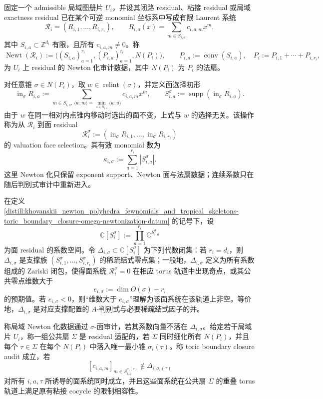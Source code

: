 \begin{definition}\label{distill:khovanskii_newton_polyhedra_fewnomials_and_tropical_skeletons-toric_boundary_closure-omega-newtonization-datum}
固定一个 admissible 局域图册片 \(U_i\)，并设其闭路 residual、粘接 residual 或局域 exactness residual 已在某个可逆 monomial 坐标系中写成有限 Laurent 系统
\[
\mathcal R_i=(R_{i,1},\ldots,R_{i,r_i}),\qquad
R_{i,a}(x)=\sum_{m\in S_{i,a}} c_{i,a,m}x^m,
\]
其中 \(S_{i,a}\subset\mathbb Z^{d_i}\) 有限，且所有 \(c_{i,a,m}\neq 0\)。称
\[
\operatorname{Newt}(\mathcal R_i)
 :=\bigl((S_{i,a})_{a=1}^{r_i},(P_{i,a})_{a=1}^{r_i},N(P_i)\bigr),\qquad
P_{i,a}:=\operatorname{conv}(S_{i,a}),\quad P_i:=P_{i,1}+\cdots+P_{i,r_i},
\]
为 \(U_i\) 上 residual 的 Newton 化审计数据，其中 \(N(P_i)\) 为 \(P_i\) 的法扇。

对任意锥 \(\sigma\in N(P_i)\)，取 \(w\in\operatorname{relint}(\sigma)\)，并定义面选择初形
\[
\operatorname{in}_{\sigma}R_{i,a}:=\sum_{m\in S_{i,a},\,\langle w,m\rangle=\min_{u\in S_{i,a}}\langle w,u\rangle}c_{i,a,m}x^m,
\qquad
S_{i,a}^{\sigma}:=\operatorname{supp}(\operatorname{in}_{\sigma}R_{i,a}).
\]
由于 \(w\) 在同一相对内点锥内移动时选出的面不变，上式与 \(w\) 的选择无关。该操作称为从 \(\mathcal R_i\) 到面 residual
\[
\mathcal R_i^{\sigma}:=(\operatorname{in}_{\sigma}R_{i,1},\ldots,\operatorname{in}_{\sigma}R_{i,r_i})
\]
的 valuation face selection。其有效 monomial 数为
\[
\kappa_{i,\sigma}:=\sum_{a=1}^{r_i}|S_{i,a}^{\sigma}|.
\]
这里 Newton 化只保留 exponent support、Newton 面与法扇数据；连续系数只在随后判别式审计中重新进入。
\end{definition}
\begin{definition}[面判别式与扇细化闭包审计]\label{distill:khovanskii_newton_polyhedra_fewnomials_and_tropical_skeletons-toric_boundary_closure-face-discriminant-audit}
在定义 \ref{distill:khovanskii_newton_polyhedra_fewnomials_and_tropical_skeletons-toric_boundary_closure-omega-newtonization-datum} 的记号下，设
\[
\mathbb C[S_i^{\sigma}]:=\prod_{a=1}^{r_i}\mathbb C^{S_{i,a}^{\sigma}}
\]
为面 residual 的系数空间。令 \(\Delta_{i,\sigma}\subset\mathbb C[S_i^{\sigma}]\) 为下列代数闭集：若 \(r_i=d_i\)，则 \(\Delta_{i,\sigma}\) 是支撑族 \((S_{i,1}^{\sigma},\ldots,S_{i,r_i}^{\sigma})\) 的稀疏结式零点集；一般地，\(\Delta_{i,\sigma}\) 定义为所有系数组成的 Zariski 闭包，使得面系统 \(\mathcal R_i^{\sigma}=0\) 在相应 torus 轨道中出现奇点，或其公共零点维数大于
\[
e_{i,\sigma}:=\dim O(\sigma)-r_i
\]
的预期值。若 \(e_{i,\sigma}<0\)，则“维数大于 \(e_{i,\sigma}\)”理解为该面系统在该轨道上非空。等价地，\(\Delta_{i,\sigma}\) 是对应支撑配置的 \(A\)-判别式与必要稀疏结式因子的并。

称局域 Newton 化数据通过 \(\sigma\)-面审计，若其系数向量不落在 \(\Delta_{i,\sigma}\)。给定若干局域片 \(U_i\)，称一组公共扇 \(\Sigma\) 是 residual 适配的，若 \(\Sigma\) 同时细化所有 \(N(P_i)\)，并且每个 \(\tau\in\Sigma\) 在每个 \(N(P_i)\) 中落入唯一最小锥 \(\sigma_i(\tau)\)。称 toric boundary closure audit 成立，若
\[
[c_{i,a,m}]_{m\in S_{i,a}^{\sigma_i(\tau)}}\notin\Delta_{i,\sigma_i(\tau)}
\]
对所有 \(i,a,\tau\) 所诱导的面系统同时成立，并且这些面系统在公共扇 \(\Sigma\) 的重叠 torus 轨道上满足原有粘接 cocycle 的限制相容性。
\end{definition}
